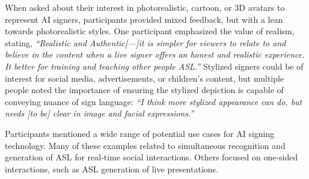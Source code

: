 When asked about their interest in photorealistic, cartoon, or 3D avatars to represent AI signers, participants provided mixed feedback, but with a lean towards photorealistic styles. One participant emphasized the value of realism, stating,
\textit{``Realistic and Authentic[---]it is simpler for viewers to relate to and believe in the content when a live signer offers an honest and realistic experience. It better for training and teaching other people ASL.''} 
Stylized signers could be of interest for social media, advertisements, or children's content, but multiple people noted the importance of ensuring the stylized depiction is capable of conveying nuance of sign language: \textit{``I think more stylized appearance can do, but needs [to be] clear in image and facial expressions.''}

Participants mentioned a wide range of potential use cases for AI signing technology. Many of these examples related to simultaneous recognition and generation of ASL for real-time social interactions. Others focused on one-sided interactions, such as ASL generation of live presentations. 


